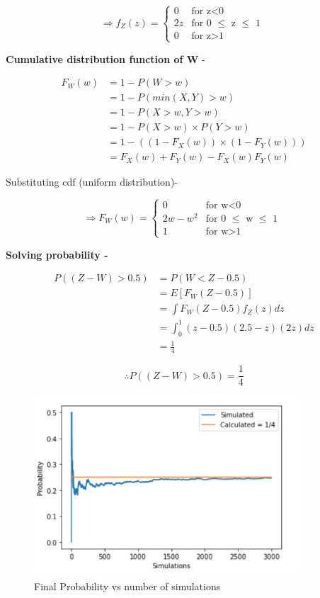 \documentclass{article}
\begin{document}
\begin{equation}
  \Rightarrow f_Z(z) =
    \begin{cases}
      0 & \text{for z$<$0}\\
      2z & \text{for 0 $\leq$ z $\leq$ 1 }\\
      0 & \text{for z$>$1}
    \end{cases}       
\end{equation}



\textbf{Cumulative distribution function of W} -

\begin{equation} 
\begin{split}
F_W(w) & = 1 - P(W>w)  \\
 & = 1 - P(min(X,Y) >w ) \\
 & = 1 - P(X>w, Y>w) \\
 & =  1 - P(X>w)\times P(Y>w) \\
 & =  1 - ((1-F_X(w)) \times (1-F_Y(w))) \\
 & = F_X(w) + F_Y(w) - F_X(w) F_Y(w)
\end{split}
\end{equation}

Substituting cdf (uniform distribution)-
 

\begin{equation}
 \Rightarrow F_W(w) =
    \begin{cases}
      0 & \text{for w$<$0}\\
      2w-w^2 & \text{for 0 $\leq$ w $\leq$ 1 }\\
      1 & \text{for w$>$1}
    \end{cases}       
\end{equation}

\textbf{Solving probability -}

\begin{equation} 
\begin{split}
P((Z-W)> 0.5) & = P(W< Z-0.5)  \\
 & = E[F_W(Z-0.5)] \\
 & = \int F_W(Z-0.5) f_Z(z) dz \\
 & =  \int_{0}^{1} (z-0.5)(2.5 - z)(2z) dz \\
 & =  \frac{1}{4}
\end{split}
\end{equation}

\begin{equation}
    \therefore P((Z-W)> 0.5) = \frac{1}{4}
\end{equation}

\begin{figure}[h]
    \centering
    \includegraphics[width=10cm]{fig.png}
    \caption{Final Probability vs number of simulations}
\end{figure}
\end{document}
